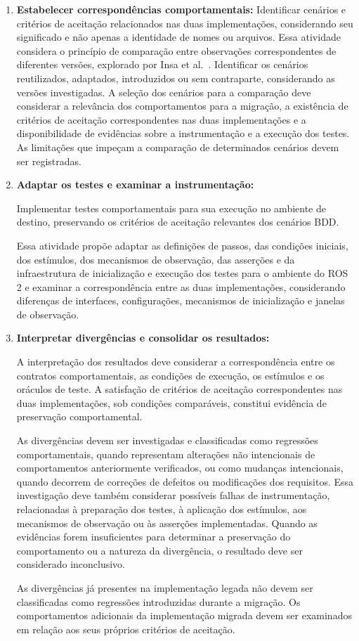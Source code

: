 \begin{enumerate}

\item \textbf{Estabelecer correspondências
comportamentais:}
Identificar cenários e critérios de aceitação relacionados nas duas implementações, considerando seu significado e não apenas a identidade de nomes ou arquivos. Essa atividade considera o princípio de comparação entre observações correspondentes de diferentes versões, explorado por Insa et al.~\cite{Insa2018}. Identificar os cenários reutilizados, adaptados, introduzidos ou sem contraparte, considerando as versões investigadas. A seleção dos cenários para a comparação deve considerar a relevância dos comportamentos para a migração, a existência de critérios de aceitação correspondentes nas duas implementações e a disponibilidade de evidências sobre a instrumentação e a execução dos testes. As limitações que impeçam a comparação de determinados cenários devem ser registradas.

\item \textbf{Adaptar os testes e examinar
a instrumentação:}

Implementar testes comportamentais
para sua execução no ambiente de destino,
preservando os critérios de aceitação relevantes
dos cenários BDD.

Essa atividade propõe adaptar as
definições de passos, das condições iniciais,
dos estímulos, dos mecanismos de observação,
das asserções e da infraestrutura de inicialização
e execução dos testes para o ambiente do ROS 2 e examinar a correspondência entre as duas implementações, considerando diferenças de interfaces, configurações, mecanismos de inicialização e janelas de observação.


\item \textbf{Interpretar divergências e consolidar os resultados:}

A interpretação dos resultados deve considerar a correspondência entre os contratos comportamentais, as condições de execução, os estímulos e os oráculos de teste. A satisfação de critérios de aceitação correspondentes nas duas implementações, sob condições comparáveis, constitui evidência de preservação comportamental.

As divergências devem ser investigadas e classificadas como regressões comportamentais, quando representam alterações não intencionais de comportamentos anteriormente verificados, ou como mudanças intencionais, quando decorrem de correções de defeitos ou modificações dos requisitos. Essa investigação deve também considerar possíveis falhas de instrumentação, relacionadas à preparação dos testes, à aplicação dos estímulos, aos mecanismos de observação ou às asserções implementadas. Quando as evidências forem insuficientes para determinar a preservação do comportamento ou a natureza da divergência, o resultado deve ser considerado inconclusivo.

As divergências já presentes na implementação legada não devem ser classificadas como regressões introduzidas durante a migração. Os comportamentos adicionais da implementação migrada devem ser examinados em relação aos seus próprios critérios de aceitação.

\end{enumerate}

